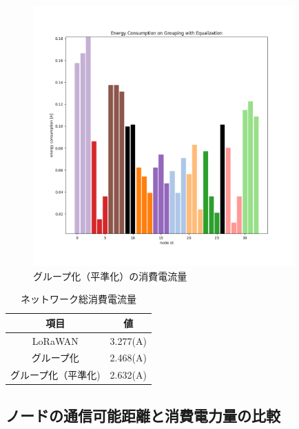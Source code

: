 \documentclass[Japanese]{dicomopapers}
\begin{document}
\begin{figure}[h]
    \centering
    \includegraphics[width=10cm]{img/group_energy_consumption_with_eq.png}
    \caption{グループ化（平準化）の消費電流量}
    \label{energy_consumption_grouping_with_eq}
\end{figure}

\begin{table}[h]
    \centering
    \caption{ネットワーク総消費電流量}
    \label{tab:total_network_energy_consumption}
    \begin{tabular}{|c|c|}
    \hline
    \textbf{項目} & \textbf{値} \\ \hline
    LoRaWAN             &  3.277(A)    \\ \hline
    グループ化　          &  2.468(A)    \\ \hline
    グループ化（平準化)    &  2.632(A)    \\ \hline
    \end{tabular}
\end{table}

\subsection{ノードの通信可能距離と消費電力量の比較}
\end{document}
